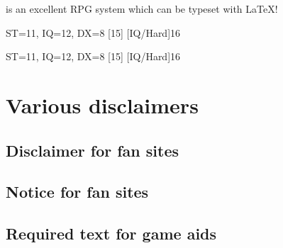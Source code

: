 \documentclass{article}
\begin{document}
\gurps is an excellent RPG system which can be typeset with \LaTeX{}!

\begin{character}{ST=11, IQ=12, DX=8}
  [15]
  [IQ/Hard]{16}
\end{character}

\begin{lens}{ST=11, IQ=12, DX=8}
  [15]
  [IQ/Hard]{16}
\end{lens}

\section{Various disclaimers}
\label{sec:various-disclaimers}

\subsection{Disclaimer for fan sites}
\label{sec:disclaimer-fan-sites}

\SJGamesOnlinePolicyDisclaimer

\subsection{Notice for fan sites}
\label{sec:disclaimer-fan-sites}

\SJGamesOnlinePolicyNotice

\subsection{Required text for game aids}
\label{sec:disclaimer-fan-sites}

\end{document}
